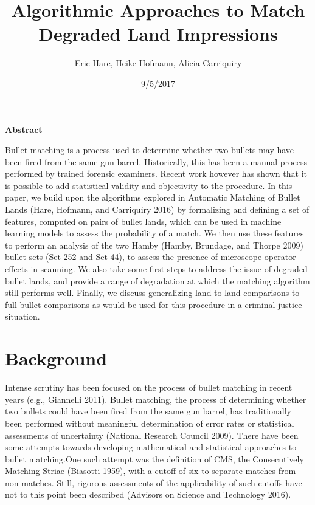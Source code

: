 \documentclass[12pt,]{article}
\title{Algorithmic Approaches to Match Degraded Land Impressions}
\author{Eric Hare, Heike Hofmann, Alicia Carriquiry}
\date{9/5/2017}
\theoremstyle{definition}
\theoremstyle{definition}
\theoremstyle{definition}
\theoremstyle{remark}
\begin{document}
\maketitle

\textbf{Abstract}

Bullet matching is a process used to determine whether two bullets may
have been fired from the same gun barrel. Historically, this has been a
manual process performed by trained forensic examiners. Recent work
however has shown that it is possible to add statistical validity and
objectivity to the procedure. In this paper, we build upon the
algorithms explored in Automatic Matching of Bullet Lands (Hare,
Hofmann, and Carriquiry 2016) by formalizing and defining a set of
features, computed on pairs of bullet lands, which can be used in
machine learning models to assess the probability of a match. We then
use these features to perform an analysis of the two Hamby (Hamby,
Brundage, and Thorpe 2009) bullet sets (Set 252 and Set 44), to assess
the presence of microscope operator effects in scanning. We also take
some first steps to address the issue of degraded bullet lands, and
provide a range of degradation at which the matching algorithm still
performs well. Finally, we discuss generalizing land to land comparisons
to full bullet comparisons as would be used for this procedure in a
criminal justice situation.

\section{Background}\label{background}

Intense scrutiny has been focused on the process of bullet matching in
recent years (e.g., Giannelli 2011). Bullet matching, the process of
determining whether two bullets could have been fired from the same gun
barrel, has traditionally been performed without meaningful
determination of error rates or statistical assessments of uncertainty
(National Research Council 2009). There have been some attempts towards
developing mathematical and statistical approaches to bullet
matching.One such attempt was the definition of CMS, the Consecutively
Matching Striae (Biasotti 1959), with a cutoff of six to separate
matches from non-matches. Still, rigorous assessments of the
applicability of such cutoffs have not to this point been described
(Advisors on Science and Technology 2016).
\end{document}
